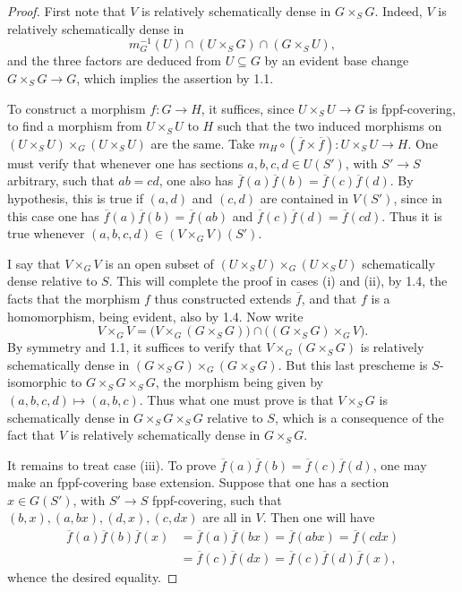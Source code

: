\begin{proof}
First note that \(V\) is relatively schematically
dense in \(G\times_S G\).
Indeed, \(V\) is relatively schematically dense in
\[
m_G^{-1}(U)\cap(U\times_S G)\cap(G\times_S U),
\]
and the three factors are deduced from
\(U\subseteq G\) by an evident base change
\(G\times_S G\to G\), which implies the
assertion by 1.1.

To construct a morphism \(f:G\to H\),
it suffices, since \(U\times_S U\to G\)
is fppf-covering, to find a morphism
from \(U\times_S U\) to \(H\) such that
the two induced morphisms on
\((U\times_S U)\times_G(U\times_S U)\)
are the same.
Take \(m_H\circ(\overline f\times\overline f):
U\times_S U\to H\).
One must verify that whenever one has
sections \(a,b,c,d\in U(S')\), with
\(S'\to S\) arbitrary, such that \(ab=cd\),
one also has
\(\overline f(a)\overline f(b)=\overline f(c)\overline f(d)\).
By hypothesis, this is true if
\((a,d)\) and \((c,d)\) are contained in
\(V(S')\), since in this case one has
\(\overline f(a)\overline f(b)=\overline f(ab)\)
and \(\overline f(c)\overline f(d)=\overline f(cd)\).
Thus it is true whenever
\((a,b,c,d)\in(V\times_G V)(S')\).

I say that \(V\times_G V\) is an open
subset of \((U\times_S U)\times_G(U\times_S U)\)
schematically dense relative to \(S\).
This will complete the proof in cases
(i) and (ii), by 1.4, the facts that the
morphism \(f\) thus constructed extends
\(\overline f\), and that \(f\) is a
homomorphism, being evident, also by 1.4.
Now write
\[
V\times_G V=
\bigl(V\times_G(G\times_S G)\bigr)
\cap\bigl((G\times_S G)\times_G V\bigr).
\]
By symmetry and 1.1, it suffices to
verify that \(V\times_G(G\times_S G)\)
is relatively schematically dense in
\((G\times_S G)\times_G(G\times_S G)\).
But this last prescheme is \(S\)-isomorphic
to \(G\times_S G\times_S G\), the
morphism being given by
\((a,b,c,d)\mapsto(a,b,c)\).
Thus what one must prove is that
\(V\times_S G\) is schematically dense
in \(G\times_S G\times_S G\) relative
to \(S\), which is a consequence of
the fact that \(V\) is relatively
schematically dense in \(G\times_S G\).

It remains to treat case (iii).
To prove
\(\overline f(a)\overline f(b)=\overline f(c)\overline f(d)\),
one may make an fppf-covering base
extension. Suppose that one has a
section \(x\in G(S')\), with
\(S'\to S\) fppf-covering, such that
\((b,x),(a,bx),(d,x),(c,dx)\)
are all in \(V\).
Then one will have
\[
\begin{aligned}
\overline f(a)\overline f(b)\overline f(x)
 &=\overline f(a)\overline f(bx)
=\overline f(abx)=\overline f(cdx)\\
 &=\overline f(c)\overline f(dx)
=\overline f(c)\overline f(d)\overline f(x),
\end{aligned}
\]
whence the desired equality.


\end{proof}
